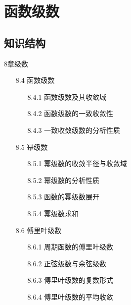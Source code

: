 \documentclass[12pt,UTF8]{ctexart}
\begin{document}
\setcounter{section}{12}
\section{函数级数}
\noindent
\subsection{知识结构}
8章级数
	\begin{enumerate}
		\item[8.4]函数级数
			\begin{enumerate}
				\item[8.4.1]函数级数及其收敛域
				\item[8.4.2]函数级数的一致收敛性
				\item[8.4.3]一致收敛级数的分析性质
			\end{enumerate}
		\item[8.5]幂级数
			\begin{enumerate}
				\item[8.5.1]幂级数的收敛半径与收敛域
				\item[8.5.2]幂级数的分析性质
				\item[8.5.3]函数的幂级数展开
				\item[8.5.4]幂级数求和
			\end{enumerate}
		\item[8.6]傅里叶级数
			\begin{enumerate}
				\item[8.6.1]周期函数的傅里叶级数
				\item[8.6.2]正弦级数与余弦级数
				\item[8.6.3]傅里叶级数的复数形式
				\item[8.6.4]傅里叶级数的平均收敛
			\end{enumerate}
	\end{enumerate}
\end{document}

